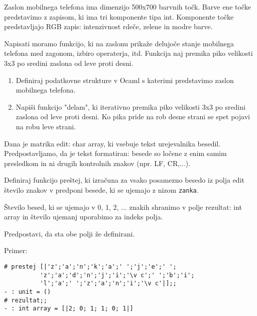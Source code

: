 \begin{ex}
Zaslon mobilnega telefona ima dimenzijo 500x700 barvnih to\v ck. Barve ene to\v cke predstavimo z zapisom, ki ima tri komponente tipa int. Komponente to\v cke predstavljajo RGB zapis: intenzivnost rde\v ce, zelene in modre barve. 

Napisati moramo funkcijo, ki na zaslonu prika\v ze delujo\v ce stanje mobilnega telefona med zagonom, izbiro operaterja, itd. Funkcija naj premika piko velikosti 3x3 po sredini zaslona od leve proti desni. 

\begin{enumerate}
\item  Definiraj podatkovne strukture v Ocaml s katerimi predstavimo zaslon mobilnega telefona.
\item  Napi\v si funkcijo "delam", ki iterativno premika piko velikosti 3x3 po sredini zaslona od leve proti desni. Ko pika pride na rob desne strani se spet pojavi na robu leve strani.
\end{enumerate}
\end{ex}




\begin{ex}
Dana je matrika edit: char array, ki vsebuje tekst urejevalnika besedil. Predpostavljamo, da je tekst formatiran: besede so lo\v cene z enim samim presledkom in ni drugih kontrolnih znakov (npr. LF, CR,...).

Definiraj funkcijo pre\v stej, ki izra\v cuna za vsako posamezno besedo iz polja edit \v stevilo znakov v predponi besede, ki se ujemajo z nizom \lstinline{zanka}. 

\v Stevilo besed, ki se ujemajo v 0, 1, 2, ... znakih shranimo v polje rezultat: int array in \v stevilo ujemanj uporabimo za indeks polja. 

Predpostavi, da sta obe polji \v ze definirani.

Primer: \begin{lstlisting} 
# prestej [|'z';'a';'n';'k';'a';' ';'j';'e';' ';
          'z';'a';'d';'n';'j';'i';'\v c';' ';'b';'i';
          'l';'a';' ';'z';'a';'n';'i';'\v c'|];;
- : unit = ()
# rezultat;;
- : int array = [|2; 0; 1; 1; 0; 1|]
\end{lstlisting}
\end{ex}




